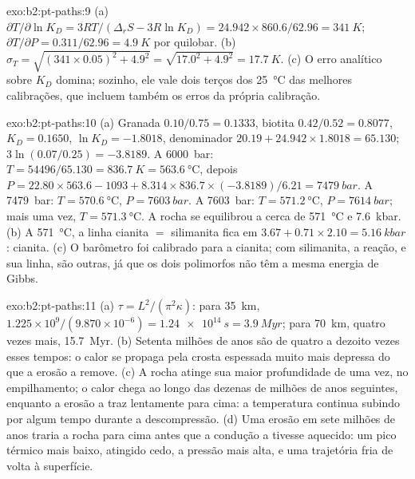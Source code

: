 \begin{solution}{exo:b2:pt-paths:9}
(a) $\partial T/\partial\ln K_D = 3RT/(\Delta_r S - 3R\ln K_D) = 24.942\times860.6/62.96 =
\qty{341}{K}$; $\partial T/\partial P = 0.311/62.96 = \qty{4.9}{K}$ por quilobar.
(b) $\sigma_T = \sqrt{(341\times0.05)^2 + 4.9^2} = \sqrt{17.0^2 + 4.9^2} =
\qty{17.7}{K}$. (c) O erro analítico sobre $K_D$ domina; sozinho, ele vale dois terços dos
\qty{25}{\celsius} das melhores calibrações, que incluem também os erros da
própria calibração.
\end{solution}

\begin{solution}{exo:b2:pt-paths:10}
(a) Granada $0.10/0.75 = 0.1333$, biotita $0.42/0.52 = 0.8077$, $K_D = 0.1650$, $\ln K_D =
-1.8018$, denominador $20.19 + 24.942\times1.8018 = 65.130$; $3\ln(0.07/0.25) = -3.8189$.
A \qty{6000}{bar}: $T = 54496/65.130 = \qty{836.7}{K} = \qty{563.6}{\celsius}$, depois $P
= 22.80\times563.6 - 1093 + 8.314\times836.7\times(-3.8189)/6.21 = \qty{7479}{bar}$.
A \qty{7479}{bar}: $T = \qty{570.6}{\celsius}$, $P = \qty{7603}{bar}$. A
\qty{7603}{bar}: $T = \qty{571.2}{\celsius}$, $P = \qty{7614}{bar}$; mais uma vez, $T =
\qty{571.3}{\celsius}$. A rocha se equilibrou a cerca de \qty{571}{\celsius} e
\qty{7.6}{kbar}. (b) A \qty{571}{\celsius}, a linha cianita $=$ silimanita fica em $3.67
+ 0.71\times2.10 = \qty{5.16}{kbar}$: cianita. (c) O barômetro foi calibrado para a
cianita; com silimanita, a reação, e sua linha, são outras, já que os dois polimorfos não
têm a mesma energia de Gibbs.
\end{solution}

\begin{solution}{exo:b2:pt-paths:11}
(a) $\tau = L^2/(\pi^2\kappa)$: para \qty{35}{km}, $1.225\times10^9/(9.870\times10^{-6}) =
\qty{1.24e14}{s} = \qty{3.9}{Myr}$; para \qty{70}{km}, quatro vezes mais,
\qty{15.7}{Myr}. (b) Setenta milhões de anos são de quatro a dezoito vezes esses tempos: o calor
se propaga pela crosta espessada muito mais depressa do que a erosão a remove. (c) A rocha
atinge sua maior profundidade de uma vez, no empilhamento; o calor chega ao longo das
dezenas de milhões de anos seguintes, enquanto a erosão a traz lentamente para cima: a temperatura continua
subindo por algum tempo durante a descompressão. (d) Uma erosão em sete milhões de anos
traria a rocha para cima antes que a condução a tivesse aquecido: um pico térmico mais baixo, atingido
cedo, a pressão mais alta, e uma trajetória fria de volta à superfície.
\end{solution}

